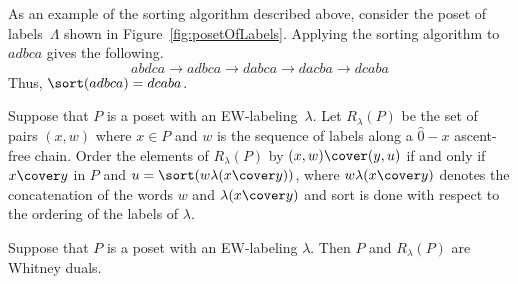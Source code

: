 As an example of the sorting algorithm described above, consider the poset of labels~$\Lambda$ shown in Figure~\ref{fig:posetOfLabels}.  Applying the sorting algorithm to $adbca$ gives the following.
$$
abdca \rightarrow adbca \rightarrow dabca \rightarrow dacba \rightarrow dcaba
$$
Thus, $\sort(adbca) = dcaba$.

\begin{defi}\label{definition:R_lambda}
Suppose that $P$ is a poset with an EW-labeling~$\lambda$.  Let $R_\lambda(P)$ be the set of pairs $(x,w)$ where $x \in P$ and $w$ is the sequence of labels along a $\hat{0}-x$ ascent-free  chain.  Order the elements of $R_\lambda(P)$ by $(x,w) \cover (y,u)$ if and only  if  $x\cover y$ in $P$ and $u =\sort(w\lambda(x\cover y))$, where $w\lambda(x\cover y)$ denotes the concatenation of the words $w$ and $\lambda(x\cover y)$ and sort is done with respect to the ordering of the labels of $\lambda$.   
\end{defi}

\begin{theo}\label{thm:WhitneyDualRLambda}
  Suppose that $P$ is a poset with an EW-labeling $\lambda$.  Then $P$ and $R_\lambda(P)$ are Whitney duals.
\end{theo}

